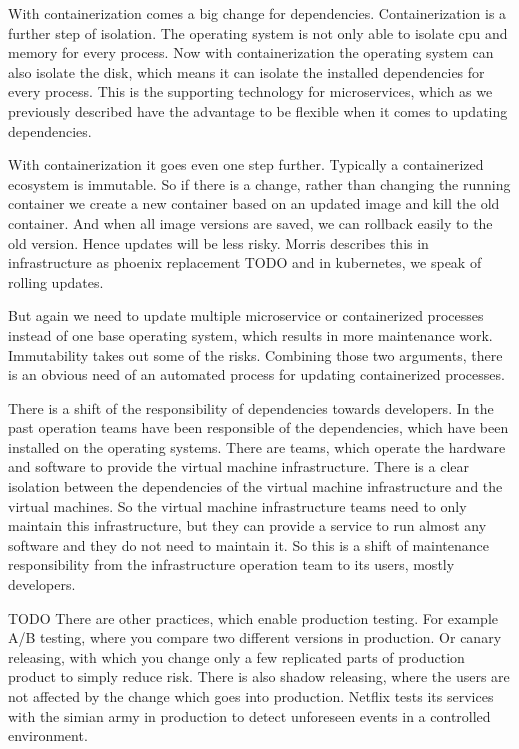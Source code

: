 With containerization comes a big change for dependencies. Containerization is a further
step of isolation. The operating system is not only able to isolate cpu and memory for
every process. Now with containerization the operating system can also isolate the disk,
which means it can isolate the installed dependencies for every process. This is the
supporting technology for microservices, which as we previously described have the
advantage to be flexible when it comes to updating dependencies.

With containerization it goes even one step further. Typically a containerized ecosystem
is immutable. So if there is a change, rather than changing the running container we
create a new container based on an updated image and kill the old container. And when all
image versions are saved, we can rollback easily to the old version. Hence updates will be
less risky. Morris describes this in infrastructure as phoenix replacement TODO and in
kubernetes, we speak of rolling updates.

But again we need to update multiple microservice or containerized processes instead of
one base operating system, which results in more maintenance work. Immutability takes out
some of the risks. Combining those two arguments, there is an obvious need of an automated
process for updating containerized processes.

There is a shift of the responsibility of dependencies towards developers. In the past
operation teams have been responsible of the dependencies, which have been installed on
the operating systems. There are teams, which operate the hardware and software to provide
the virtual machine infrastructure. There is a clear isolation between the dependencies of
the virtual machine infrastructure and the virtual machines. So the virtual machine
infrastructure teams need to only maintain this infrastructure, but they can provide a
service to run almost any software and they do not need to maintain it. So this is a shift
of maintenance responsibility from the infrastructure operation team to its users, mostly
developers.

TODO There are other practices, which enable production testing. For example A/B testing,
where you compare two different versions in production. Or canary releasing, with which
you change only a few replicated parts of production product to simply reduce risk. There
is also shadow releasing, where the users are not affected by the change which goes into
production. Netflix tests its services with the simian army in production to detect
unforeseen events in a controlled environment.

